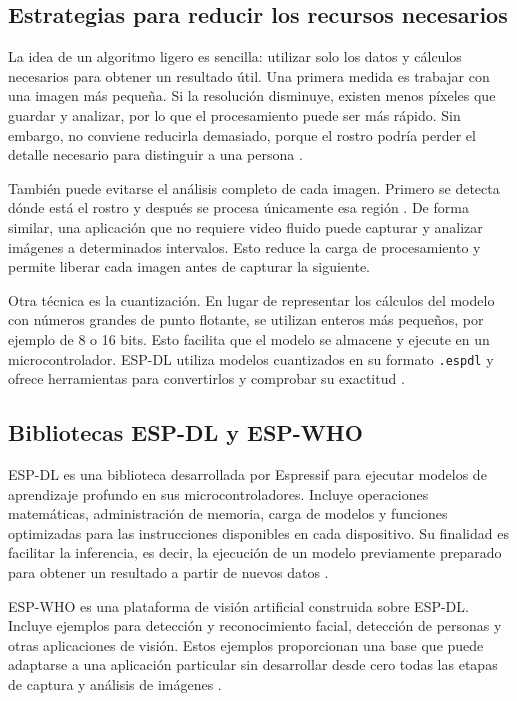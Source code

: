 \subsection{Estrategias para reducir los recursos necesarios}

La idea de un algoritmo ligero es sencilla: utilizar solo los datos y cálculos
necesarios para obtener un resultado útil. Una primera medida es trabajar con
una imagen más pequeña. Si la resolución disminuye, existen menos píxeles que
guardar y analizar, por lo que el procesamiento puede ser más rápido. Sin
embargo, no conviene reducirla demasiado, porque el rostro podría perder el
detalle necesario para distinguir a una persona
\cite{MobileNet2017,MCUNet2020}.

También puede evitarse el análisis completo de cada imagen. Primero se detecta
dónde está el rostro y después se procesa únicamente esa región
\cite{ESPWHOGetStarted2026}. De forma similar, una aplicación que no requiere
video fluido puede capturar y analizar imágenes a determinados intervalos. Esto
reduce la carga de procesamiento y permite liberar cada imagen antes de
capturar la siguiente.

Otra técnica es la cuantización. En lugar de representar los cálculos del modelo
con números grandes de punto flotante, se utilizan enteros más pequeños, por
ejemplo de 8 o 16 bits. Esto facilita que el modelo se almacene y ejecute en un
microcontrolador. ESP-DL utiliza modelos cuantizados en su formato
\texttt{.espdl} y ofrece herramientas para convertirlos y comprobar su exactitud
\cite{ESPDLQuantization}.

\subsection{Bibliotecas ESP-DL y ESP-WHO}

ESP-DL es una biblioteca desarrollada por Espressif para ejecutar modelos de
aprendizaje profundo en sus microcontroladores. Incluye operaciones matemáticas,
administración de memoria, carga de modelos y funciones optimizadas para las
instrucciones disponibles en cada dispositivo. Su finalidad es facilitar la
inferencia, es decir, la ejecución de un modelo previamente preparado para
obtener un resultado a partir de nuevos datos \cite{ESPDLGuide}.

ESP-WHO es una plataforma de visión artificial construida sobre ESP-DL. Incluye
ejemplos para detección y reconocimiento facial, detección de personas y otras
aplicaciones de visión. Estos ejemplos proporcionan una base que puede adaptarse
a una aplicación particular sin desarrollar desde cero todas las etapas de
captura y análisis de imágenes \cite{ESPWHO}.

